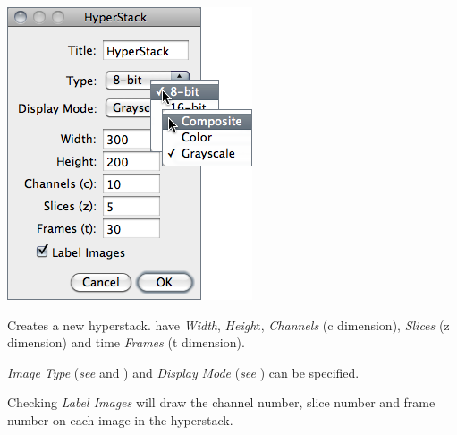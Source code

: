 \begin{minipage}[c][1\totalheight][t]{0.39\columnwidth}%
\includegraphics[scale=0.55]{images/NewHyperstack}%
\end{minipage}%
\begin{minipage}[c][1\totalheight][t]{0.61\columnwidth}%
Creates a new hyperstack.  have \emph{Width},
\emph{Heigh}t, \emph{Channels} (c dimension), \emph{Slices} (z dimension)
and time \emph{Frames} (t dimension). 

\medskip{}


\emph{Image} \emph{Type} (\emph{see} 
and ) and \emph{Display} \emph{Mode} (\emph{see}
) can be specified. \medskip{}


Checking \emph{Label Images} will draw the channel number, slice number
and frame number on each image in the hyperstack.


%
\end{minipage}


\subsubsection[\protect\userinterface{Stack to Hyperstack\ldots{}}]{\protect{}\label{sub:Stack-to-Hyperstack...}\improvement{}}

